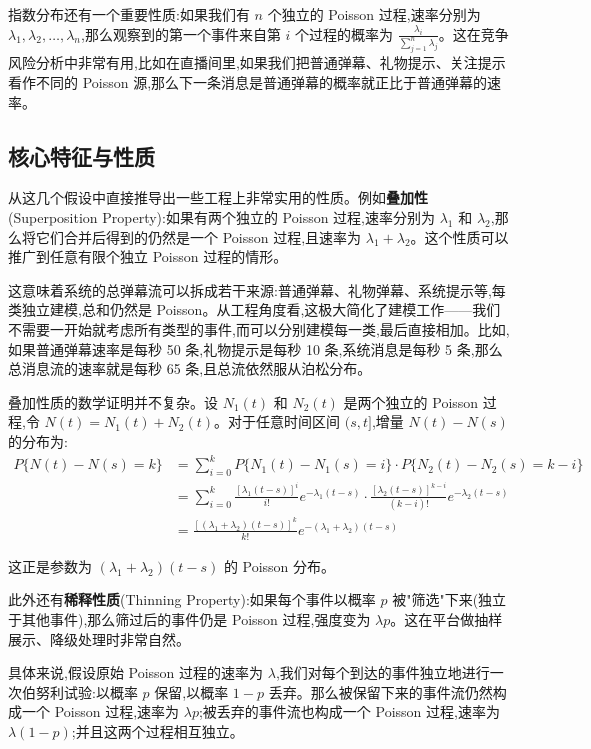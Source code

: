 \documentclass[12pt,a4paper]{article}
\begin{document}
指数分布还有一个重要性质:如果我们有 $n$ 个独立的 Poisson 过程,速率分别为 $\lambda_1, \lambda_2, \ldots, \lambda_n$,那么观察到的第一个事件来自第 $i$ 个过程的概率为 $\frac{\lambda_i}{\sum_{j=1}^n \lambda_j}$。这在竞争风险分析中非常有用,比如在直播间里,如果我们把普通弹幕、礼物提示、关注提示看作不同的 Poisson 源,那么下一条消息是普通弹幕的概率就正比于普通弹幕的速率。

\subsection{核心特征与性质}

从这几个假设中直接推导出一些工程上非常实用的性质。例如\textbf{叠加性}(Superposition Property):如果有两个独立的 Poisson 过程,速率分别为 $\lambda_1$ 和 $\lambda_2$,那么将它们合并后得到的仍然是一个 Poisson 过程,且速率为 $\lambda_1 + \lambda_2$。这个性质可以推广到任意有限个独立 Poisson 过程的情形。

这意味着系统的总弹幕流可以拆成若干来源:普通弹幕、礼物弹幕、系统提示等,每类独立建模,总和仍然是 Poisson。从工程角度看,这极大简化了建模工作——我们不需要一开始就考虑所有类型的事件,而可以分别建模每一类,最后直接相加。比如,如果普通弹幕速率是每秒 50 条,礼物提示是每秒 10 条,系统消息是每秒 5 条,那么总消息流的速率就是每秒 65 条,且总流依然服从泊松分布。

叠加性质的数学证明并不复杂。设 $N_1(t)$ 和 $N_2(t)$ 是两个独立的 Poisson 过程,令 $N(t) = N_1(t) + N_2(t)$。对于任意时间区间 $(s,t]$,增量 $N(t)-N(s)$ 的分布为:
\begin{align}
P\{N(t)-N(s) = k\} &= \sum_{i=0}^{k} P\{N_1(t)-N_1(s) = i\} \cdot P\{N_2(t)-N_2(s) = k-i\} \\
&= \sum_{i=0}^{k} \frac{[\lambda_1(t-s)]^i}{i!}e^{-\lambda_1(t-s)} \cdot \frac{[\lambda_2(t-s)]^{k-i}}{(k-i)!}e^{-\lambda_2(t-s)} \\
&= \frac{[(\lambda_1+\lambda_2)(t-s)]^k}{k!}e^{-(\lambda_1+\lambda_2)(t-s)}
\end{align}

这正是参数为 $(\lambda_1+\lambda_2)(t-s)$ 的 Poisson 分布。

此外还有\textbf{稀释性质}(Thinning Property):如果每个事件以概率 $p$ 被"筛选"下来(独立于其他事件),那么筛过后的事件仍是 Poisson 过程,强度变为 $\lambda p$。这在平台做抽样展示、降级处理时非常自然。

具体来说,假设原始 Poisson 过程的速率为 $\lambda$,我们对每个到达的事件独立地进行一次伯努利试验:以概率 $p$ 保留,以概率 $1-p$ 丢弃。那么被保留下来的事件流仍然构成一个 Poisson 过程,速率为 $\lambda p$;被丢弃的事件流也构成一个 Poisson 过程,速率为 $\lambda(1-p)$;并且这两个过程相互独立。
\end{document}
